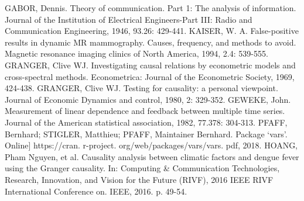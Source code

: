 \documentclass[a4paper,11pt,oneside]{book}
\begin{document}
\begin{thebibliography}{00}
GABOR, Dennis. Theory of communication. Part 1: The analysis of information. Journal of the Institution of Electrical Engineers-Part III: Radio and Communication Engineering, 1946, 93.26: 429-441.
KAISER, W. A. False-positive results in dynamic MR mammography. Causes, frequency, and methods to avoid. Magnetic resonance imaging clinics of North America, 1994, 2.4: 539-555.
GRANGER, Clive WJ. Investigating causal relations by econometric models and cross-spectral methods. Econometrica: Journal of the Econometric Society, 1969, 424-438.
GRANGER, Clive WJ. Testing for causality: a personal viewpoint. Journal of Economic Dynamics and control, 1980, 2: 329-352.
GEWEKE, John. Measurement of linear dependence and feedback between multiple time series. Journal of the American statistical association, 1982, 77.378: 304-313.
PFAFF, Bernhard; STIGLER, Matthieu; PFAFF, Maintainer Bernhard. Package ‘vars’. Online] https://cran. r-project. org/web/packages/vars/vars. pdf, 2018.
HOANG, Pham Nguyen, et al. Causality analysis between climatic factors and dengue fever using the Granger causality. In: Computing \& Communication Technologies, Research, Innovation, and Vision for the Future (RIVF), 2016 IEEE RIVF International Conference on. IEEE, 2016. p. 49-54.
\end{thebibliography}






\appendix




%


\end{document}
